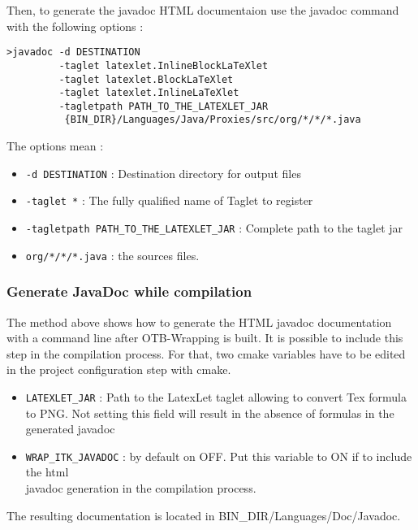 Then, to generate the javadoc HTML documentaion use the javadoc command with the following options : 

\begin{verbatim}
>javadoc -d DESTINATION 
         -taglet latexlet.InlineBlockLaTeXlet 
         -taglet latexlet.BlockLaTeXlet 
         -taglet latexlet.InlineLaTeXlet 
         -tagletpath PATH_TO_THE_LATEXLET_JAR   
          {BIN_DIR}/Languages/Java/Proxies/src/org/*/*/*.java
\end{verbatim}

The options mean :
\begin{itemize}
\item \verb!-d DESTINATION! : Destination directory for output files
\item \verb!-taglet *!      : The fully qualified name of Taglet to register
\item \verb!-tagletpath PATH_TO_THE_LATEXLET_JAR! : Complete path to the taglet jar
\item \verb!org/*/*/*.java! : the sources files. 
\end{itemize}


\subsubsection{Generate JavaDoc while compilation}
The method above shows how to generate the HTML javadoc documentation with 
a command line after OTB-Wrapping is built. It is possible to include this step 
in the compilation process. 
For that, two cmake variables have to be edited in the project configuration step with cmake.
\begin{itemize}
\item  \verb!LATEXLET_JAR! : Path to the LatexLet taglet allowing to convert Tex formula to PNG. 
       Not setting this field will result in the absence of formulas in the generated javadoc
\item  \verb!WRAP_ITK_JAVADOC! : by default on OFF. Put this variable to ON if to include the html \\
       javadoc generation in the compilation process.
\end{itemize}

The resulting documentation is located in BIN\_DIR/Languages/Doc/Javadoc.


